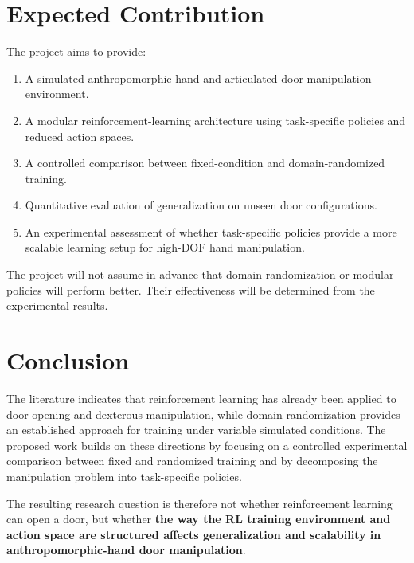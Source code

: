 \documentclass[12pt,a4paper]{report}
\begin{document}
\section{Expected Contribution}

The project aims to provide:

\begin{enumerate}
    \item A simulated anthropomorphic hand and articulated-door manipulation environment.
    \item A modular reinforcement-learning architecture using task-specific policies and reduced action spaces.
    \item A controlled comparison between fixed-condition and domain-randomized training.
    \item Quantitative evaluation of generalization on unseen door configurations.
    \item An experimental assessment of whether task-specific policies provide a more scalable learning setup for high-DOF hand manipulation.
\end{enumerate}

The project will not assume in advance that domain randomization or modular policies will perform better. Their effectiveness will be determined from the experimental results.

\section{Conclusion}

The literature indicates that reinforcement learning has already been applied to door opening and dexterous manipulation, while domain randomization provides an established approach for training under variable simulated conditions. The proposed work builds on these directions by focusing on a controlled experimental comparison between fixed and randomized training and by decomposing the manipulation problem into task-specific policies.

The resulting research question is therefore not whether reinforcement learning can open a door, but whether \textbf{the way the RL training environment and action space are structured affects generalization and scalability in anthropomorphic-hand door manipulation}.
\end{document}
